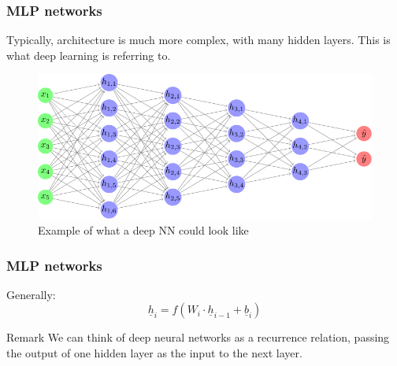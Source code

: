 \documentclass{beamer}
\begin{document}

\begin{frame}
    \frametitle{MLP networks}
    Typically, architecture is much more complex, with many hidden layers. This is what \alert{deep} learning is referring to.
    \begin{figure}
        \centering
        \includegraphics[height=0.5\textheight]{./figures/mlp/main.pdf}
        \caption{Example of what a deep NN could look like}
    \end{figure}
\end{frame}

\begin{frame}
    \frametitle{MLP networks}
    Generally:
    \[\underline{h}_i = f(W_i \cdot \underline{h}_{i - 1} + \underline{b}_i)\]
    \begin{block}{Remark}
        We can think of deep neural networks as a recurrence relation, passing the output of one hidden layer as the input to the next layer.
    \end{block}
\end{frame}
\end{document}
